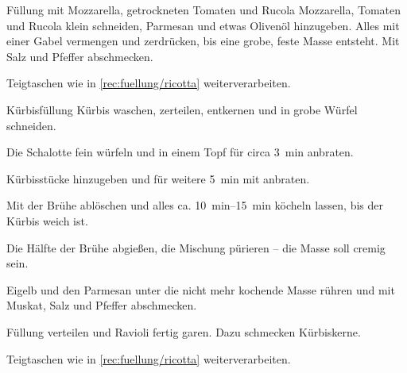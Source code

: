 \documentclass[a4paper, ngerman]{article}
\begin{document}
\begin{recipe}{Füllung mit Mozzarella, getrockneten Tomaten und Rucola}{}{}
    Mozzarella, Tomaten und Rucola klein schneiden, Parmesan und etwas Olivenöl hinzugeben. Alles mit einer Gabel vermengen und zerdrücken, bis eine grobe, feste Masse entsteht. Mit Salz und Pfeffer abschmecken.

    \newstep
    Teigtaschen wie in \cref{rec:fuellung/ricotta} weiterverarbeiten.
    \freeform\hrulefill
\end{recipe}

\begin{recipe}{Kürbisfüllung}{}{}
    Kürbis waschen, zerteilen, entkernen und in grobe Würfel schneiden.

    Die Schalotte fein würfeln und in einem Topf für circa \SI{3}{\minute} anbraten.

    Kürbisstücke hinzugeben und für weitere \SI{5}{\minute} mit anbraten.

    Mit der Brühe ablöschen und alles ca. \SIrange{10}{15}{\minute} köcheln lassen, bis der Kürbis weich ist.

    Die Hälfte der Brühe abgießen, die Mischung pürieren – die Masse soll cremig sein.

    Eigelb und  den Parmesan unter die nicht mehr kochende Masse rühren und mit Muskat, Salz und Pfeffer abschmecken.

    Füllung verteilen und Ravioli fertig garen. Dazu schmecken Kürbiskerne.

    \newstep
    Teigtaschen wie in \cref{rec:fuellung/ricotta} weiterverarbeiten.
    \freeform\hrulefill
\end{recipe}
\end{document}
